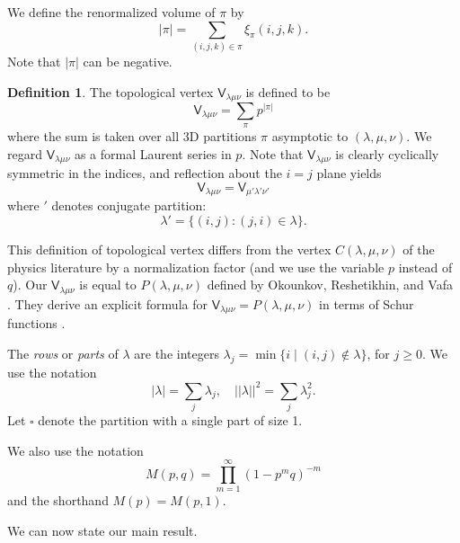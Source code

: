 \documentclass[12pt]{amsart}
\newcommand{\Vsf}{\mathsf{V}}
\newcommand{\bx}{\square}
\theoremstyle{definition}
\newtheorem{defn}[theorem]{Definition}
\begin{document}
We define the renormalized volume of $\pi $ by
\[
|\pi | = \sum _{(i,j,k)\in \pi } \xi _{\pi } (i,j,k).
\]
Note that $|\pi |$ can be negative.
\begin{defn}\label{defn: box counting vertex}
The topological vertex $\Vsf_{\lambda \mu \nu }$ is defined to be
\[
\Vsf _{\lambda \mu \nu }= \sum _{\pi } p^{|\pi |}
\]
where the sum is taken over all 3D partitions $\pi $ asymptotic to
$(\lambda ,\mu ,\nu )$. We regard $\Vsf _{\lambda \mu \nu }$ as a
formal Laurent series in $p$. Note that $\Vsf _{\lambda \mu \nu }$ is
clearly cyclically symmetric in the indices, and reflection about the
$i=j$ plane yields
\[
\Vsf _{\lambda \mu \nu } = \Vsf _{\mu '\lambda '\nu '}
\]
where $'$ denotes conjugate partition:
\[
\lambda ' = \{(i,j): (j,i)\in \lambda  \}.
\]

\end{defn}
This definition of topological vertex differs from the vertex $C
(\lambda ,\mu ,\nu )$ of the physics literature by a normalization
factor (and we use the variable $p$ instead of $q$). Our $\Vsf
_{\lambda \mu \nu }$ is equal to $P (\lambda ,\mu ,\nu )$ defined by
Okounkov, Reshetikhin, and Vafa \cite[eqn~3.16]{Ok-Re-Va}. They derive
an explicit formula for $\Vsf _{\lambda \mu \nu }=P (\lambda, \mu, \nu
)$ in terms of Schur functions \cite[eqns~3.20 and 3.21]{Ok-Re-Va}.



The \emph{rows} or \emph{parts} of $\lambda $
are the integers $\lambda _j = \min \{i \;|\;(i,j) \not \in \lambda
\}$, for $j \geq 0$. We use the notation
\[
|\lambda | = \sum_{j} \lambda_{j},\quad ||\lambda ||^{2} =\sum_{j}\lambda_{j}^{2}.
\]
Let $\bx$ denote the partition with a single part of size 1.

We also use the notation
\[
M(p,q) = \prod_{m=1}^{\infty} (1-p^{m}q)^{-m}
\]
and the shorthand $M(p)=M(p,1)$.

We can now state our main result.
\end{document}

